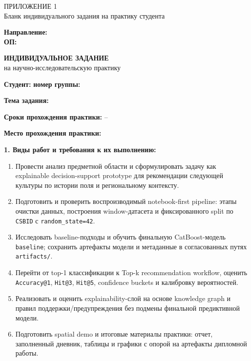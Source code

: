 \begin{center}
{\large ПРИЛОЖЕНИЕ 1}\\[0.5em]
Бланк индивидуального задания на практику студента
\end{center}

\vspace{1em}

\begin{center}
\textbf{\MakeUppercase{\UniversityName}}
\end{center}

\noindent\textbf{Направление:} \DirectionName\\
\textbf{ОП:} \ProgramName

\vspace{1.5em}

\begin{center}
{\Large\bfseries ИНДИВИДУАЛЬНОЕ ЗАДАНИЕ}\\[0.3em]
на научно-исследовательскую практику
\end{center}

\vspace{1em}

\noindent\textbf{Студент:} \StudentName \hfill \textbf{номер группы:} \StudentGroup

\noindent\textbf{Тема задания:} \PracticeTheme

\noindent\textbf{Сроки прохождения практики:} \PracticeStart{} -- \PracticeEnd

\noindent\textbf{Место прохождения практики:} \PracticePlace

\vspace{0.75em}

\noindent\textbf{1. Виды работ и требования к их выполнению:}
\begin{enumerate}
\item Провести анализ предметной области и сформулировать задачу как explainable decision-support prototype для рекомендации следующей культуры по истории поля и региональному контексту.
\item Подготовить и проверить воспроизводимый notebook-first pipeline: этапы очистки данных, построения window-датасета и фиксированного split по \texttt{CSBID} с \texttt{random\_state=42}.
\item Исследовать baseline-подходы и обучить финальную CatBoost-модель \texttt{baseline}; сохранить артефакты модели и метаданные в согласованных путях \texttt{artifacts/}.
\item Перейти от top-1 классификации к Top-k recommendation workflow, оценить \texttt{Accuracy@1}, \texttt{Hit@3}, \texttt{Hit@5}, confidence buckets и калибровку вероятностей.
\item Реализовать и оценить explainability-слой на основе knowledge graph и правил поддержки/предупреждения без подмены финальной предиктивной модели.
\item Подготовить spatial demo и итоговые материалы практики: отчет, заполненный дневник, таблицы и графики с опорой на артефакты дипломной работы.
\end{enumerate}


